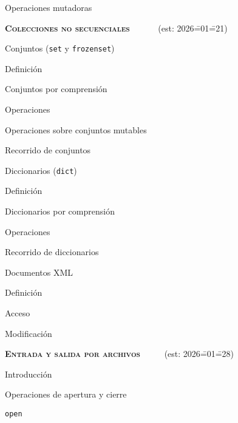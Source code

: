 \begin{longenum}
\begin{longenum}
\begin{longenum}
\begin{longenum}
            \end{longenum}
            \item Operaciones mutadoras
        \end{longenum}
    \end{longenum}
    \item \textbf{\textsc{Colecciones no secuenciales}} \ \ \ \ \ \ (est: 2026\==01\==21)
    \begin{longenum}
        \item Conjuntos (\texttt{set} y \texttt{frozenset})
        \begin{longenum}
            \item Definición
            \item Conjuntos por comprensión
            \item Operaciones
            \item Operaciones sobre conjuntos mutables
            \item Recorrido de conjuntos
        \end{longenum}
        \item Diccionarios (\texttt{dict})
        \begin{longenum}
            \item Definición
            \item Diccionarios por comprensión
            \item Operaciones
            \item Recorrido de diccionarios
        \end{longenum}
        \item Documentos XML
        \begin{longenum}
            \item Definición
            \item Acceso
            \item Modificación
        \end{longenum}
    \end{longenum}
    \item \textbf{\textsc{Entrada y salida por archivos}} \ \ \ \ \ (est: 2026\==01\==28)
    \begin{longenum}
        \item Introducción
        \item Operaciones de apertura y cierre
        \begin{longenum}
            \item \texttt{open}

\end{longenum}
\end{longenum}
\end{longenum}
